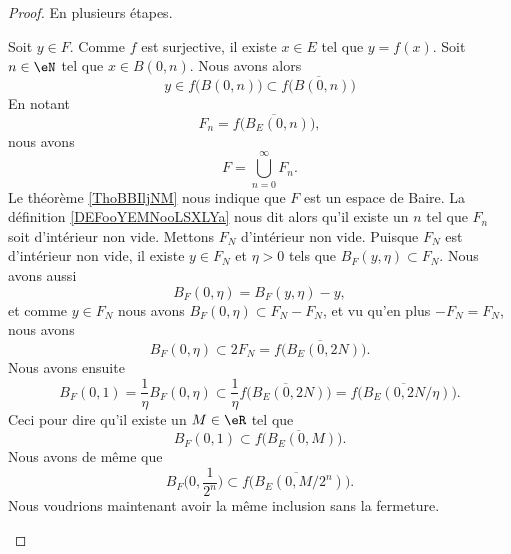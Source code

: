 \begin{proof}
	En plusieurs étapes.
	\begin{subproof}
		Soit \( y\in F\). Comme \( f\) est surjective, il existe \( x\in E\) tel que \( y=f(x)\). Soit \( n\in \eN\) tel que \( x\in B(0,n)\). Nous avons alors
		\begin{equation}
			y\in f\big( B(0,n) \big)\subset \overline{ f\big( B(0,n) \big) }
		\end{equation}
		En notant
		\begin{equation}
			F_n=\overline{ f\big( B_E(0,n) \big) },
		\end{equation}
		nous avons
		\begin{equation}
			F=\bigcup_{n=0}^{\infty}F_n.
		\end{equation}
		Le théorème \ref{ThoBBIljNM} nous indique que \( F\) est un espace de Baire. La définition \ref{DEFooYEMNooLSXLYa} nous dit alors qu'il existe un \( n\) tel que \( F_n\) soit d'intérieur non vide. Mettons \( F_N\) d'intérieur non vide.
		Puisque \( F_N\) est d'intérieur non vide, il existe \( y\in F_N\) et \( \eta>0\) tels que \( B_F(y,\eta)\subset F_N\). Nous avons aussi
		\begin{equation}
			B_F(0,\eta)=B_F(y,\eta)-y,
		\end{equation}
		et comme \( y\in F_N\) nous avons \( B_F(0,\eta)\subset F_N-F_N\), et vu qu'en plus \( -F_N=F_N\), nous avons
		\begin{equation}
			B_F(0,\eta)\subset 2F_N=\overline{ f\big( B_E(0,2N) \big) }.
		\end{equation}
		Nous avons ensuite
		\begin{equation}
			B_F(0,1)=\frac{1}{ \eta }B_F(0,\eta)\subset\frac{1}{ \eta }\overline{ f\big( B_E(0,2N) \big) }=\overline{ f\big( B_E(0,2N/\eta) \big) }.
		\end{equation}
		Ceci pour dire qu'il existe un \( M\in \eR\) tel que
		\begin{equation}
			B_F(0,1)\subset \overline{ f\big( B_E(0,M) \big) }.
		\end{equation}
		Nous avons de même que
		\begin{equation}        \label{EQooCMSPooYtzAuC}
			B_F\big( 0,\frac{1}{ 2^n } \big)\subset \overline{ f\big( B_E(0,M/2^n) \big) }.
		\end{equation}
		Nous voudrions maintenant avoir la même inclusion sans la fermeture.


\end{subproof}
\end{proof}
